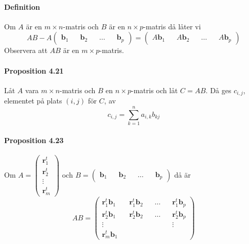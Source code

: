 \paragraph{Definition} Om $A$ är en $m\times n$-matris och $B$ är en $n\times p$-matris då låter vi 
\begin{equation*}
    AB-A\begin{pmatrix}
        \bm{b}_{1}&& \bm{b}_{2} &&\ldots&&\bm{b}_{p}
    \end{pmatrix}=\begin{pmatrix}
        A\bm{b}_{1}&& A\bm{b}_{2} && \ldots &&A\bm{b}_{p}
    \end{pmatrix}
\end{equation*}
Observera att $AB$ är en $m\times p$-matris.

\paragraph{Proposition 4.21} Låt $A$ vara $m\times n$-matris och $B$ en $n\times p$-matris och låt $C=AB$.
Då ges $c_{i,j}$, elementet på plats $(i,j)$ för $C$, av 
\begin{equation*}
    c_{i,j}=\sum_{k=1}^{n}a_{i,k}b_{kj}
\end{equation*}

\paragraph{Proposition 4.23} Om $A=\begin{pmatrix}\bm{r}^{t}_{1}\\\bm{r}^{t}_{2}\\\vdots\\\bm{r}^{t}_{m}\end{pmatrix}$ och 
$B=\begin{pmatrix}\bm{b}_{1}&&\bm{b}_{2}&&\ldots&&\bm{b}_{p}\end{pmatrix}$ då är 
\begin{equation*}
        AB=\begin{pmatrix}
        \bm{r}^{t}_{1}\bm{b}_{1} && \bm{r}^{t}_{1}\bm{b}_{2} && \ldots && \bm{r}^{t}_{1}\bm{b}_{p}\\
        \bm{r}^{t}_{2}\bm{b}_{1} && \bm{r}^{t}_{2}\bm{b}_{2} && \ldots && \bm{r}^{t}_{2}\bm{b}_{p}\\
        \vdots && && && \vdots\\
        \bm{r}^{t}_{m}\bm{b}_{1}
    \end{pmatrix}
\end{equation*}

